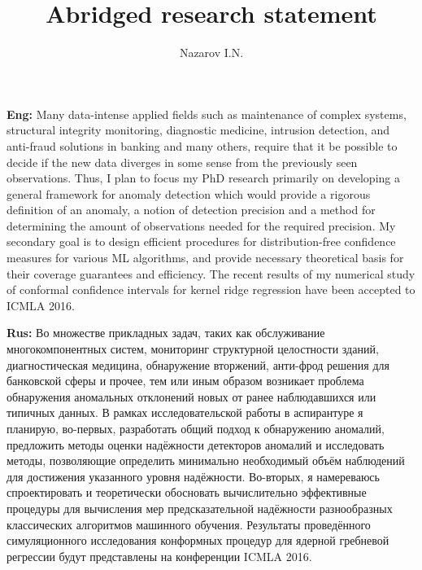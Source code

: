 \documentclass[a4paper]{extarticle}
\title{Abridged research statement}
\author{Nazarov I.N.}
\newcommand{\eng}[1]{\foreignlanguage{english}{#1}}
\begin{document}
\maketitle

\noindent \textbf{\eng{Eng}:}
Many data-intense applied fields such as maintenance of complex systems, structural
integrity monitoring, diagnostic medicine, intrusion detection, and anti-fraud solutions
in banking and many others, require that it be possible to decide if the new data
diverges in some sense from the previously seen observations. Thus, I plan to focus
my PhD research primarily on developing a general framework for anomaly detection
which would provide a rigorous definition of an anomaly, a notion of detection precision
and a method for determining the amount of observations needed for the required precision.
My secondary goal is to design efficient procedures for distribution-free confidence
measures for various ML algorithms, and provide necessary theoretical basis for
their coverage guarantees and efficiency. The recent results of my numerical study
of conformal confidence intervals for kernel ridge regression have been accepted
to ICMLA 2016.\par \bigskip

\noindent \textbf{\eng{Rus}:}
Во множестве прикладных задач, таких как обслуживание многокомпонентных систем,
мониторинг структурной целостности зданий, диагностическая медицина, обнаружение
вторжений, анти-фрод решения для банковской сферы и прочее, тем или иным образом
возникает проблема обнаружения аномальных отклонений новых от ранее наблюдавшихся
или типичных данных. В рамках исследовательской работы в аспирантуре я планирую,
во-первых, разработать общий подход к обнаружению аномалий, предложить методы оценки
надёжности детекторов аномалий и исследовать методы, позволяющие определить минимально
необходимый объём наблюдений для достижения указанного уровня надёжности.
Во-вторых, я намереваюсь спроектировать и теоретически обосновать вычислительно
эффективные процедуры для вычисления мер предсказательной надёжности разнообразных
классических алгоритмов машинного обучения. Результаты проведённого симуляционного
исследования конформных процедур для ядерной гребневой регрессии будут представлены
на конференции \eng{ICMLA} 2016.
\end{document}
